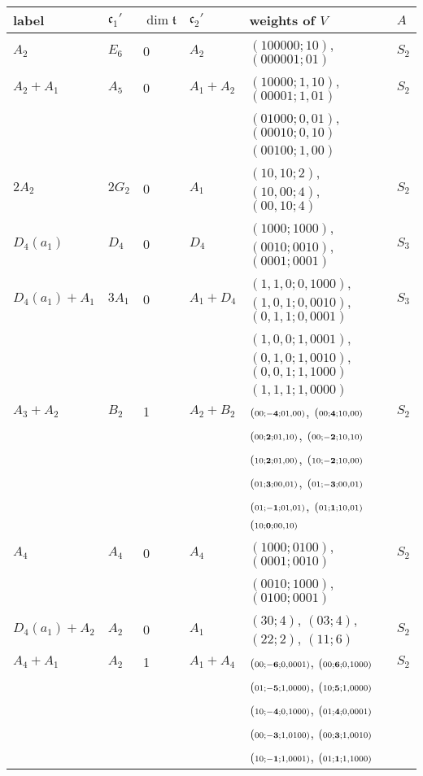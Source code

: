 \documentclass[a4paper,10pt]{amsart}
\newcommand{\mf}{\mathfrak}
\renewcommand{\c}{\mf{c}}
\newcommand{\wtt}[3]{{\small (\scriptstyle{#1};\scriptstyle{\mathbf{#2}};\scriptstyle{#3})}}
\newcommand{\wts}[2]{{({\scriptstyle{#1}};{\scriptstyle{#2}})}}
\newcommand{\ttt}{\mf{t}}
\numberwithin{equation}{section}
\theoremstyle{remark}
\theoremstyle{remark}
\begin{document}
\begin{longtable}{|l|l|l|l|l|l|}
\hline
label & $\c_1'$ & $\dim \ttt$ & $\c_2'$ & weights of $V$ & $A$\\
\hline
$A_2$ & $E_6$ & 0 & $A_2$ & $\wts{100000}{10}$, $\wts{000001}{01}$ & $S_2$\\
$A_2+A_1$ & $A_5$ & 0 & $A_1+A_2$ & $\wts{10000}{1,10}$, $\wts{00001}{1,01}$ &
$S_2$\\
& & & &  $\wts{01000}{0,01}$, $\wts{00010}{0,10}$ & \\
& & & &  $\wts{00100}{1,00}$ & \\
$2A_2$ & $2G_2$ & 0 & $A_1$ & $\wts{10,10}{2}$, $\wts{10,00}{4}$,
$\wts{00,10}{4}$ & $S_2$\\
$D_4(a_1)$ & $D_4$ & 0 & $D_4$ & $\wts{1000}{1000}$, $\wts{0010}{0010}$,
$\wts{0001}{0001}$ & $S_3$\\
$D_4(a_1)+A_1$ & $3A_1$ & 0 & $A_1+D_4$ & $\wts{1,1,0}{0,1000}$,
$\wts{1,0,1}{0,0010}$, $\wts{0,1,1}{0,0001}$ & $S_3$\\
& & & & $\wts{1,0,0}{1,0001}$,$\wts{0,1,0}{1,0010}$, $\wts{0,0,1}{1,1000}$ &\\
& & & &  $\wts{1,1,1}{1,0000}$ & \\
$A_3+A_2$ & $B_2$ & 1 & $A_2+B_2$ & $\wtt{00}{-4}{01,00}$, $\wtt{00}{4}{10,00}$ &
$S_2$\\
& & & & $\wtt{00}{2}{01,10}$, $\wtt{00}{-2}{10,10}$ & \\
& & & & $\wtt{10}{2}{01,00}$, $\wtt{10}{-2}{10,00}$ & \\
& & & & $\wtt{01}{3}{00,01}$, $\wtt{01}{-3}{00,01}$ & \\
& & & & $\wtt{01}{-1}{01,01}$, $\wtt{01}{1}{10,01}$ & \\
& & & & $\wtt{10}{0}{00,10}$ & \\
$A_4$ & $A_4$ & 0 & $A_4$ & $\wts{1000}{0100}$, $\wts{0001}{0010}$ & $S_2$\\
& & & & $\wts{0010}{1000}$, $\wts{0100}{0001}$ & \\
$D_4(a_1)+A_2$ & $A_2$ & 0 & $A_1$ & $\wts{30}{4}$, $\wts{03}{4}$, $\wts{22}{2}$,
$\wts{11}{6}$ & $S_2$\\
$A_4+A_1$ & $A_2$ & 1 & $A_1+A_4$ & $\wtt{00}{-6}{0,0001}$,
$\wtt{00}{6}{0,1000}$ & $S_2$\\
& & & & $\wtt{01}{-5}{1,0000}$, $\wtt{10}{5}{1,0000}$ &\\
& & & & $\wtt{10}{-4}{0,1000}$, $\wtt{01}{4}{0,0001}$ &\\
& & & & $\wtt{00}{-3}{1,0100}$, $\wtt{00}{3}{1,0010}$ &\\
& & & & $\wtt{10}{-1}{1,0001}$, $\wtt{01}{1}{1,1000}$ &\\

\end{longtable}
\end{document}
